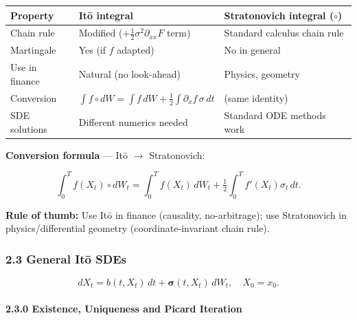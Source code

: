 \documentclass[11pt,a4paper]{article}
\begin{document}
{\def\LTcaptype{none} %
\begin{longtable}[]{@{}
  >{\raggedright\arraybackslash}p{}
  >{\raggedright\arraybackslash}p{}
  >{\raggedright\arraybackslash}p{}@{}}
\toprule\noalign{}
\begin{minipage}[b]{\linewidth}\raggedright
Property
\end{minipage} & \begin{minipage}[b]{\linewidth}\raggedright
Itō integral
\end{minipage} & \begin{minipage}[b]{\linewidth}\raggedright
Stratonovich integral (\(\circ\))
\end{minipage} \\
\midrule\noalign{}
\endhead
\bottomrule\noalign{}
\endlastfoot
Chain rule & Modified (\(+\tfrac12\sigma^2\partial_{xx}F\) term) & Standard calculus chain rule \\
Martingale & Yes (if \(f\) adapted) & No in general \\
Use in finance & Natural (no look-ahead) & Physics, geometry \\
Conversion & \(\int f\circ dW = \int f\,dW + \tfrac12\int \partial_x f\,\sigma\,dt\) & (same identity) \\
SDE solutions & Different numerics needed & Standard ODE methods work \\
\end{longtable}
}

\textbf{Conversion formula} --- Itō \(\to\) Stratonovich:

\[\int_0^T f(X_t)\circ dW_t = \int_0^T f(X_t)\,dW_t + \tfrac{1}{2}\int_0^T f'(X_t)\sigma_t\,dt.\]

\textbf{Rule of thumb:} Use Itō in finance (causality, no-arbitrage); use Stratonovich in physics/differential geometry (coordinate-invariant chain rule).

\subsubsection{2.3 General Itō SDEs}\label{general-itux14d-sdes}

\[dX_t = b(t, X_t)\,dt + \boldsymbol{\sigma}(t, X_t)\,dW_t,\quad X_0 = x_0.\]

\paragraph{2.3.0 Existence, Uniqueness and Picard Iteration}\label{existence-uniqueness-and-picard-iteration}
\end{document}
